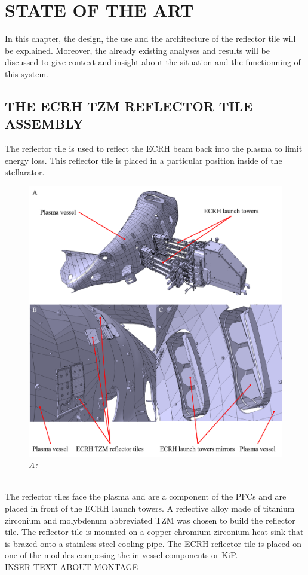 \chapter{STATE OF THE ART}
\normalsize{In this chapter, the design, the use and the architecture of the reflector tile will be explained. Moreover, the already existing analyses and results will be discussed to give context and insight about the situation and the functionning of this system.}
\section{THE \acrshort{ECRH} \acrshort{TZM} REFLECTOR TILE ASSEMBLY}
\normalsize{The reflector tile is used to reflect the \acrshort{ECRH} beam back into the plasma to limit energy loss. This reflector tile is placed in a particular position inside of the stellarator.}
\\
\begin{figure}[h!]
    \centering
    \includegraphics[width=1\textwidth]{figures/ecrhposition2.png}
    \caption{\it A: }
\end{figure}
\\
\break
\normalsize{\indent  The reflector tiles face the plasma and are a component of the \acrshort{PFCs} and are placed in front of the \acrshort{ECRH} launch towers. A reflective alloy made of titanium zirconium and molybdenum abbreviated \acrshort{TZM} was chosen to build the reflector tile. The reflector tile is mounted on a copper chromium zirconium heat sink that is brazed onto a stainless steel cooling pipe. The \acrshort{ECRH} reflector tile is placed on one of the modules composing the in-vessel components or \acrshort{KiP}.}
\\
\break
\normalsize{\indent INSER TEXT ABOUT MONTAGE}
